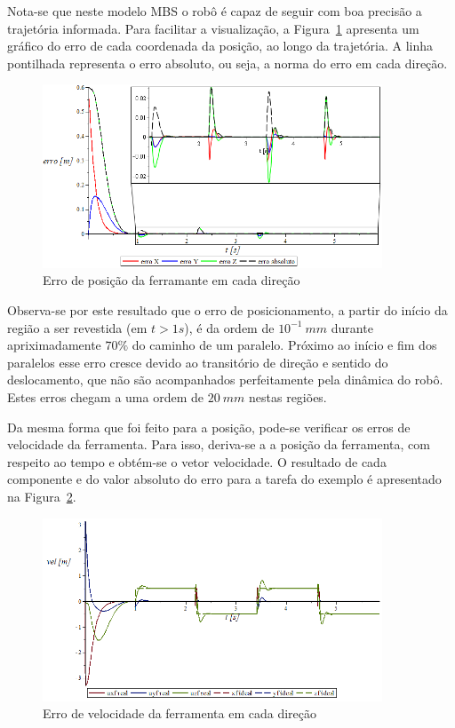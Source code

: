 Nota-se que neste modelo MBS o robô é capaz de seguir com boa precisão a
trajetória informada. Para facilitar a visualização, a
Figura~\ref{fig::erros_exemplo_z} apresenta um gráfico do erro de cada coordenada
da posição, ao longo da trajetória. A linha pontilhada representa o erro
absoluto, ou seja, a norma do erro em cada direção.

\begin{figure}[h]
	\centering 
 	\includegraphics[width=0.90\textwidth]{figs/erros_exemplo_z}
 	\caption{Erro de posição da ferramante em cada direção}
 	\label{fig::erros_exemplo_z}
\end{figure}

Observa-se por este resultado que o erro de posicionamento, a partir do início
da região a ser revestida (em $t>1s$), é da ordem de $10^{-1}~mm$ durante
apriximadamente $70\%$ do caminho de um paralelo. Próximo ao início e fim dos
paralelos esse erro cresce devido ao transitório de direção e sentido do
deslocamento, que não são acompanhados perfeitamente pela dinâmica do robô.
Estes erros chegam a uma ordem de $20~mm$ nestas regiões.

Da mesma forma que foi feito para a posição, pode-se verificar os erros de
velocidade da ferramenta. Para isso, deriva-se a a posição da ferramenta, com
respeito ao tempo e obtém-se o vetor velocidade. O resultado de cada componente
e do valor absoluto do erro para a tarefa do exemplo é apresentado na
Figura~\ref{fig::errovel_exemplo}.

\begin{figure}[h]
	\centering 
 	\includegraphics[width=0.90\textwidth]{figs/errovel_exemplo}
 	\caption{Erro de velocidade da ferramenta em cada direção}
 	\label{fig::errovel_exemplo}
\end{figure}

